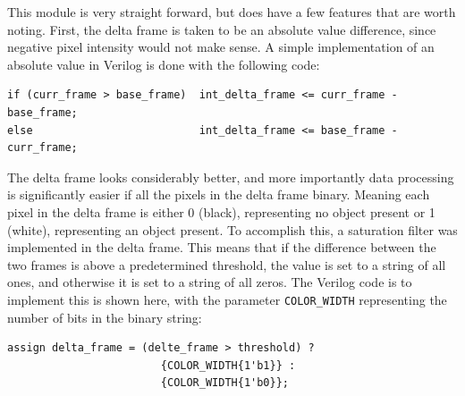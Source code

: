 \documentclass[11pt]{article} %
\begin{document}
This module is very straight forward, but does have a few features that are worth noting. First, the delta frame is taken to be an absolute value difference, since negative pixel intensity would not make sense. A simple implementation of an absolute value in Verilog is done with the following code:
\begin{verbatim}
if (curr_frame > base_frame)  int_delta_frame <= curr_frame - base_frame;
else                          int_delta_frame <= base_frame - curr_frame;
\end{verbatim}
The delta frame looks considerably better, and more importantly data processing is significantly easier if all the pixels in the delta frame binary. Meaning each pixel in the delta frame is either 0 (black), representing no object present or 1 (white), representing an object present. To accomplish this, a saturation filter was implemented in the delta frame. This means that if the difference between the two frames is above a predetermined threshold, the value is set to a string of all ones, and otherwise it is set to a string of all zeros. The Verilog code is to implement this is shown here, with the parameter \texttt{COLOR\_WIDTH} representing the number of bits in the binary string:
\begin{verbatim}
assign delta_frame = (delte_frame > threshold) ? 
						{COLOR_WIDTH{1'b1}} :
						{COLOR_WIDTH{1'b0}};
\end{verbatim}
\end{document}
